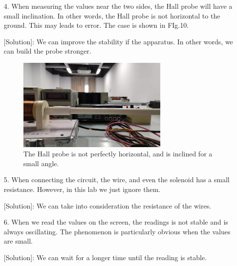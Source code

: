 \documentclass[a4paper,12pt]{article}
\begin{document}
\begin{itemize}
\begin{itemize}
	[Solution]: We can record more groups of data when the Hall probe is near the two sides.
	\item The theoretical value we use in this lab is measured when $I_M$ = 0.1 A. However, in this lab our $I_M$ = 0.25 A. Although we have changed the scale, some errors may still occur.
	
	[Solution]: We can either find a theoretical with $I_M$ = 0.25 A, or in the experiment we simply choose $I_M$ = 0.1 A.
	\end{itemize}

\item[4.] When measuring the values near the two sides, the Hall probe will have a small inclination. In other words, the Hall probe is not horizontal to the ground. This may leads to error. The case is shown in FIg.10.

	[Solution]: We can improve the stability if the apparatus. In other words, we can build the probe stronger.

\begin{figure}[H] 
    \centering
    \includegraphics[width=0.7\textwidth]{p4} 
    \caption{The Hall probe is not perfectly horizontal, and is inclined for a small angle.} 
\end{figure}

\item[5.] When connecting the circuit, the wire, and even the solenoid has a small resistance. However, in this lab we just ignore them.

	[Solution]: We can take into consideration the resistance of the wires.
	
\item[6.] When we read the values on the screen, the readings is not stable and is always oscillating. The phenomenon is particularly obvious when the values are small.

	[Solution]: We can wait for a longer time until the reading is stable.
\end{itemize}
\end{document}
